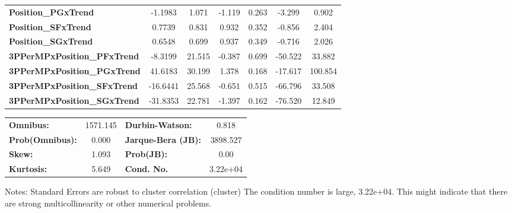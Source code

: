 \begin{center}
\begin{tabular}{lcccccc}
\textbf{Position\_PGxTrend}         &      -1.1983  &        1.071     &    -1.119  &         0.263        &       -3.299    &        0.902     \\
\textbf{Position\_SFxTrend}         &       0.7739  &        0.831     &     0.932  &         0.352        &       -0.856    &        2.404     \\
\textbf{Position\_SGxTrend}         &       0.6548  &        0.699     &     0.937  &         0.349        &       -0.716    &        2.026     \\
\textbf{3PPerMPxPosition\_PFxTrend} &      -8.3199  &       21.515     &    -0.387  &         0.699        &      -50.522    &       33.882     \\
\textbf{3PPerMPxPosition\_PGxTrend} &      41.6183  &       30.199     &     1.378  &         0.168        &      -17.617    &      100.854     \\
\textbf{3PPerMPxPosition\_SFxTrend} &     -16.6441  &       25.568     &    -0.651  &         0.515        &      -66.796    &       33.508     \\
\textbf{3PPerMPxPosition\_SGxTrend} &     -31.8353  &       22.781     &    -1.397  &         0.162        &      -76.520    &       12.849     \\
\bottomrule
\end{tabular}
\begin{tabular}{lclc}
\textbf{Omnibus:}       & 1571.145 & \textbf{  Durbin-Watson:     } &    0.818  \\
\textbf{Prob(Omnibus):} &   0.000  & \textbf{  Jarque-Bera (JB):  } & 3898.527  \\
\textbf{Skew:}          &   1.093  & \textbf{  Prob(JB):          } &     0.00  \\
\textbf{Kurtosis:}      &   5.649  & \textbf{  Cond. No.          } & 3.22e+04  \\
\bottomrule
\end{tabular}
\end{center}

Notes: \newline
 [1] Standard Errors are robust to cluster correlation (cluster) \newline
 [2] The condition number is large, 3.22e+04. This might indicate that there are \newline
 strong multicollinearity or other numerical problems.